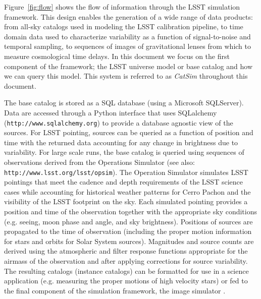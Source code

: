 \documentclass[]{article}
\begin{document}
Figure~\ref{fig:flow} shows the flow of information through the LSST
simulation framework.
This design enables the generation of a wide range of data products:
from all-sky catalogs used in modeling the LSST calibration pipeline,
to time domain data used to characterize variability as a function of
signal-to-noise and temporal sampling, to sequences of images of
gravitational lenses from which to measure cosmological time delays.
In this document we focus on the first component of the framework; the
LSST universe model or base catalog and how we can query this
model. This system is referred to as {\it CatSim} throughout this
document.

The base catalog is stored as a SQL database (using a Microsoft
SQLServer). Data are accessed through a Python interface that uses
SQLalchemy ({\tt http://www.sqlalchemy.org}) to provide a database
agnostic view of the sources. For LSST pointing, sources can be
queried as a function of position and time with the returned data
accounting for any change in brightness due to variability. For large
scale runs, the base catalog is queried using sequences of
observations derived from the Operations Simulator \citep{cook09} (see
also: {\tt http://www.lsst.org/lsst/opsim}).  The Operation Simulator
simulates LSST pointings that meet the cadence and depth requirements
of the LSST science cases while accounting for historical weather
patterns for Cerro Pachon and the visibility of the LSST footprint on
the sky. Each simulated pointing provides a position and time of the
observation together with the appropriate sky conditions (e.g. seeing,
moon phase and angle, and sky brightness). Positions of sources are
propagated to the time of observation (including the proper motion
information for stars and orbits for Solar System sources). Magnitudes
and source counts are derived using the atmospheric and filter
response functions appropriate for the airmass of the observation and
after applying corrections for source variability. The resulting
catalogs (instance catalogs) can be formatted for use in a science
application (e.g. measuring the proper motions of high velocity stars)
or fed to the final component of the simulation framework, the image
simulator \citep{phosim}.
\end{document}
